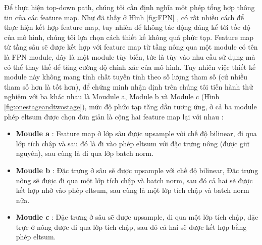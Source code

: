 \documentclass[a4paper]{article}
\begin{document}
Để thực hiện top-down path, chúng tôi cần định nghĩa một phép tổng hợp thông tin của các feature map. Như đã thấy ở Hình \ref{fig:FPN} , có rất nhiều cách để thực hiện kết hợp feature map, tuy nhiên để không tác động đáng kể tới tốc độ của mô hình, chúng tôi lựa chọn cách thiết kế không quá phức tạp. Feature map từ tầng sâu sẽ được kết hợp với feature map từ tầng nông qua một module có tên là FPN module, đây là một module tùy biến, tức là tùy vào nhu cầu sử dụng mà có thể thay thế để tăng cường độ chính xác của mô hình. Tuy nhiên việc thiết kế module này không mang tính chất tuyến tính theo số lượng tham số (cứ nhiều tham số hơn là tốt hơn), để chứng minh nhận định trên chúng tôi tiến hành thử nghiệm với ba khác nhau là Moudule a, Module b và Module c (Hình \ref{fig:onestageandtwostage}), mức độ phức tạp tăng dần tương ứng, ở cả ba module phép eltsum được chọn đơn giản là cộng hai feature map lại với nhau :

\begin{itemize}
	\item \textbf{Moudle a} : Feature map ở lớp sâu được upsample với chế độ bilinear, đi qua lớp tích chập và sau đó là đi vào phép eltsum với đặc trưng nông (được giữ nguyên), sau cùng là đi qua lớp batch norm. 
	\item \textbf{Moudle b} : Đặc trưng ở sâu sẽ được upsample với chế độ bilinear, Đặc trưng nông sẽ được đi qua một lớp tích chập và batch norm, sau đó cả hai sẽ được kết hợp nhờ vào phép eltsum, sau cùng là một lớp tích chập và batch norm nữa.
	\item \textbf{Moudle c} : Đặc trưng ở sâu sẽ được upsample, đi qua một lớp tích chập, đặc trực ở nông được đi qua lớp tích chập, sau đó cả hai sẽ được kết hợp bằng phép eltsum.
\end{itemize}
\end{document}
